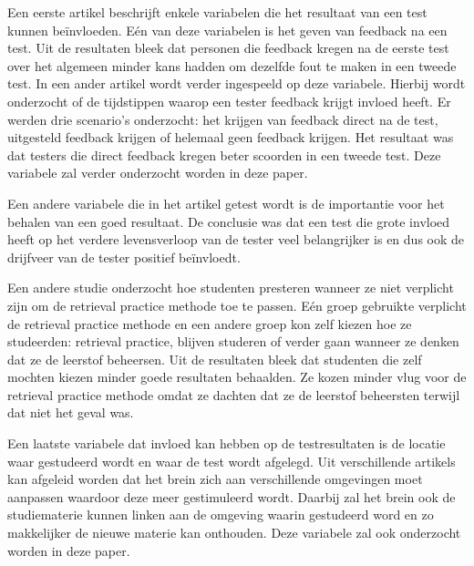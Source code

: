 \documentclass{hogent-article}
\begin{document}
    
    Een eerste artikel \autocite{brame2015test} beschrijft enkele variabelen die het resultaat van een test kunnen beïnvloeden. Eén van deze variabelen is het geven van feedback na een test. Uit de resultaten bleek dat personen die feedback kregen na de eerste test over het algemeen minder kans hadden om dezelfde fout te maken in een tweede test.
    In een ander artikel \autocite{roediger2011critical} wordt verder ingespeeld op deze variabele. Hierbij wordt onderzocht of de tijdstippen waarop een tester feedback krijgt invloed heeft. Er werden drie scenario's onderzocht: het krijgen van feedback direct na de test, uitgesteld feedback krijgen of helemaal geen feedback krijgen. Het resultaat was dat testers die direct feedback kregen beter scoorden in een tweede test. Deze variabele zal verder onderzocht worden in deze paper.
    
    Een andere variabele die in het artikel \autocite{brame2015test} getest wordt is de importantie voor het behalen van een goed resultaat. De conclusie was dat een test die grote invloed heeft op het verdere levensverloop van de tester veel belangrijker is en dus ook de drijfveer van de tester positief beïnvloedt.
    
    Een andere studie \autocite{karpicke2009metacognitive} onderzocht hoe studenten presteren wanneer ze niet verplicht zijn om de retrieval practice methode toe te passen. Eén groep gebruikte verplicht de retrieval practice methode en een andere groep kon zelf kiezen hoe ze studeerden: retrieval practice, blijven studeren of verder gaan wanneer ze denken dat ze de leerstof beheersen. Uit de resultaten bleek dat studenten die zelf mochten kiezen minder goede resultaten behaalden. Ze kozen minder vlug voor de retrieval practice methode omdat ze dachten dat ze de leerstof beheersten terwijl dat niet het geval was. 
    
    
    Een laatste variabele dat invloed kan hebben op de testresultaten is de locatie waar gestudeerd wordt en waar de test wordt afgelegd. Uit verschillende artikels \autocite{smith1978environmental, smith1984contextual} kan afgeleid worden dat het brein zich aan verschillende omgevingen moet aanpassen waardoor deze meer gestimuleerd wordt. Daarbij zal het brein ook de studiematerie kunnen linken aan de omgeving waarin gestudeerd word en zo makkelijker de nieuwe materie kan onthouden. Deze variabele zal ook onderzocht worden in deze paper.
      
\end{document}
